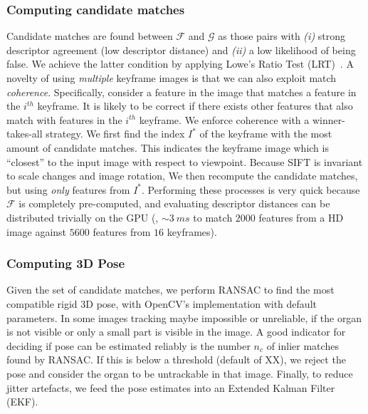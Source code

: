 \subsubsection{Computing candidate matches}
Candidate matches are found between $\mathcal{F}$ and $\mathcal{G}$ as those pairs with \textit{(i)} strong descriptor agreement (\ie low descriptor distance) and \textit{(ii)} a low likelihood of being false.
We achieve the latter condition by applying Lowe's Ratio Test (LRT)~\cite{Lowe:2004:DIF:993451.996342}.
A novelty of using \emph{multiple} keyframe images is that we can also exploit match \emph{coherence}. Specifically, consider a feature in the image that matches a feature in the $i^{th}$ keyframe. It is likely to be correct if there exists other features that also match with features in the $i^{th}$ keyframe.
We enforce coherence with a winner-takes-all strategy. We first find the index $I^*$ of the keyframe with the most amount of candidate matches. This indicates the keyframe image which is ``closest'' to the input image with respect to viewpoint. Because SIFT is invariant to scale changes and image rotation, %
We then recompute the candidate matches, but using \emph{only} features from $I^*$.
Performing these processes is very quick because $\mathcal{F}$ is completely pre-computed, and evaluating descriptor distances can be distributed trivially on the GPU (\eg, $\sim\SI{3}{ms}$ to match $2000$ features from a HD image against $5600$ features from $16$ keyframes).

\subsubsection{Computing 3D Pose}
Given the set of candidate matches, we perform RANSAC to find the most compatible rigid 3D pose, with OpenCV's implementation with default parameters. In some images tracking maybe impossible or unreliable, if the organ is not visible or only a small part is visible in the image. A good indicator for deciding if pose can be estimated reliably is the number $n_c$ of inlier matches found by RANSAC. If this is below a threshold (default of XX), we reject the pose and consider the organ to be untrackable in that image. Finally, to reduce jitter artefacts, we feed the pose estimates into an Extended Kalman Filter (EKF). 




